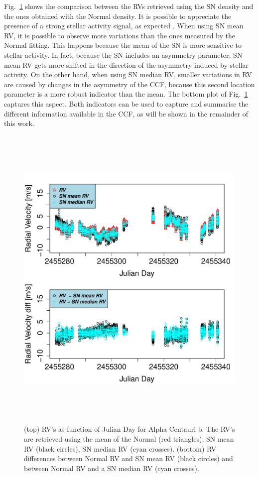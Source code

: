 \documentclass[11pt, oneside]{article}
\begin{document}
Fig.~\ref{fig:alphacent:diff:RV} shows the comparison between the RVs retrieved using the SN density and the ones obtained with the Normal density. It is possible to appreciate the presence of a strong stellar activity signal, as expected \citep{Dumusque-2012,Thompson-2017}. When using SN mean RV, it is possible to observe more variations than the ones measured by the Normal fitting. This happens because the mean of the SN is more sensitive to stellar activity. In fact, because the SN includes an asymmetry parameter, SN mean RV gets more shifted in the direction of the asymmetry induced by stellar activity. On the other hand, when using SN median RV, smaller variations in RV are caused by changes in the asymmetry of the CCF, because this second location parameter is a more robust indicator than the mean. The bottom plot of Fig.~\ref{fig:alphacent:diff:RV} captures this aspect. Both indicators can be used to capture and summarise the different information available in the CCF, as will be shown in the remainder of this work.
%
\begin{figure}[htbp]
   \centering
\includegraphics[height = 6in]{HD12862_[2]RadialVelocityDifferences.pdf} 
   \caption{(top) RV's as function of Julian Day for Alpha Centauri b. The RV's are retrieved using the mean of the Normal (red triangles), SN mean RV (black circles), SN median RV (cyan crosses). (bottom) RV differences between Normal RV and SN mean RV (black circles) and between Normal RV and a SN median RV (cyan crosses).}
   \label{fig:alphacent:diff:RV}
\end{figure}
%
\end{document}
